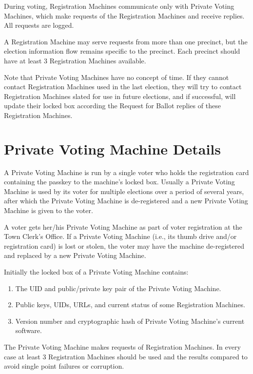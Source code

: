 \documentclass[12pt]{article}
\begin{document}
During voting, Registration Machines communicate only with
Private Voting Machines, which make requests of the Registration
Machines and receive replies.  All requests are logged.

A Registration Machine may serve requests from more than
one precinct, but the election information flow remains specific
to the precinct.  Each precinct should have at least 3
Registration Machines available.

Note that Private Voting Machines have no concept of time.
If they cannot contact Registration Machines used in the last
election, they will try to contact Registration Machines
slated for use in future elections, and if successful, will
update their locked box according the Request for Ballot
replies of these Registration Machines.

\section{Private Voting Machine Details}

A Private Voting Machine is run by a single voter
who holds the registration card containing the passkey to
the machine's locked box.  Usually a Private Voting Machine
is used by its voter for multiple elections over a period
of several years, after which the Private Voting Machine
is de-registered and a new Private Voting Machine
is given to the voter.

A voter gets her/his Private Voting Machine as part of voter
registration at the Town Clerk's Office.
If a Private Voting Machine (i.e., its thumb drive and/or registration
card) is lost or stolen, the voter may have the machine
de-registered and replaced by a new Private Voting Machine.

Initially the locked box of a Private Voting Machine contains:
\begin{enumerate}
\item The UID and public/private key pair of the Private Voting Machine.
\item Public keys, UIDs, URLs, and current status of some Registration Machines.
\item Version number and cryptographic hash of Private Voting Machine's current
      software.
\setcounter{PVM-COUNTER}{\value{enumi}}
\end{enumerate}

The Private Voting Machine
makes requests of Registration Machines.  In every case
at least 3 Registration Machines should be used and the
results compared to avoid single point failures or corruption.
\end{document}
